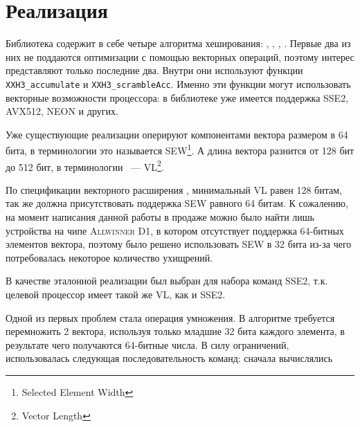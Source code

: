 
\section{Реализация}

Библиотека содержит в себе четыре алгоритма хеширования: , , , .
Первые два из них не поддаются оптимизации с помощью векторных операций, поэтому интерес представляют только последние два.
Внутри они используют функции \texttt{XXH3\_accumulate} и \texttt{XXH3\_scrambleAcc}.
Именно эти функции могут использовать векторные возможности процессора: в библиотеке уже имеется поддержка \textsc{SSE2, AVX512, NEON} и других.

Уже существующие реализации оперируют компонентами вектора размером в 64 бита, в терминологии \riscv{} это называется \textsc{SEW\footnote{Selected Element Width}}.
А длина вектора разнится от 128 бит до 512 бит, в терминологии \riscv{}~--- \textsc{VL\footnote{Vector Length}}.

По спецификации векторного расширения \riscv{}, минимальный \textsc{VL} равен 128 битам, так же должна присутствовать поддержка \textsc{SEW} равного 64 битам.
К сожалению, на момент написания данной работы в продаже можно было найти лишь устройства на чипе \textsc{Allwinner D1}, в котором отсутствует поддержка 64-битных элементов вектора, поэтому было решено использовать \textsc{SEW} в 32 бита из-за чего потребовалась некоторое количество ухищрений.

В качестве эталонной реализации был выбран для набора команд \textsc{SSE2}, т.к. целевой процессор имеет такой же \textsc{VL}, как и \textsc{SSE2}.

Одной из первых проблем стала операция умножения.
В алгоритме требуется перемножить 2 вектора, используя только младшие 32 бита каждого элемента, в результате чего получаются 64-битные числа.
В силу ограничений, использовалась следующая последовательность команд: сначала вычислялись




